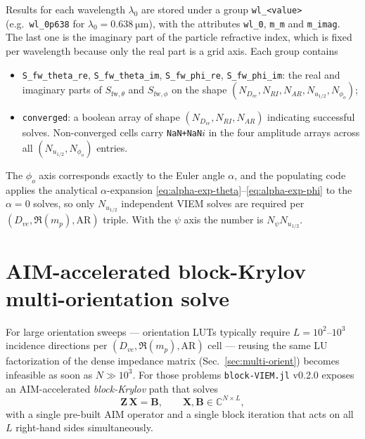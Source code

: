 \documentclass[11pt,a4paper]{article}
\begin{document}
Results for each wavelength $\lambda_0$ are stored under a group
\texttt{wl\_<value>} (e.g.\ \texttt{wl\_0p638} for
$\lambda_0 = \SI{0.638}{\micro\metre}$), with the attributes
\texttt{wl\_0}, \texttt{m\_m} and \texttt{m\_imag}. The last one is
the imaginary part of the particle refractive index, which is fixed per
wavelength because only the real part is a grid axis. Each group
contains
\begin{itemize}
  \item \texttt{S\_fw\_theta\_re}, \texttt{S\_fw\_theta\_im},
        \texttt{S\_fw\_phi\_re}, \texttt{S\_fw\_phi\_im}: the real and
        imaginary parts of $S_{\text{fw},\theta}$ and
        $S_{\text{fw},\phi}$ on the shape
        $(N_{D_{ve}}, N_{RI}, N_{AR}, N_{u_{1/2}}, N_{\phi_o})$;
  \item \texttt{converged}: a boolean array of shape
        $(N_{D_{ve}}, N_{RI}, N_{AR})$ indicating successful solves.
        Non-converged cells carry \texttt{NaN+NaN$i$} in the four
        amplitude arrays across all $(N_{u_{1/2}},N_{\phi_o})$ entries.
\end{itemize}
The $\phi_o$ axis corresponds exactly to the Euler angle $\alpha$, and
the populating code applies the analytical $\alpha$-expansion
\eqref{eq:alpha-exp-theta}--\eqref{eq:alpha-exp-phi} to the $\alpha = 0$
solves, so only $N_{u_{1/2}}$ independent VIEM solves are required per
$(D_{ve},\Re(m_p),\text{AR})$ triple. With the $\psi$ axis the number
is $N_\psi N_{u_{1/2}}$.

\section{AIM-accelerated block-Krylov multi-orientation solve}
\label{sec:block-krylov}

For large orientation sweeps --- orientation LUTs typically require
$L = 10^2$--$10^3$ incidence directions per $(D_{ve},\Re(m_p),
\text{AR})$ cell --- reusing the same LU factorization of the dense
impedance matrix (Sec.~\ref{sec:multi-orient}) becomes infeasible as
soon as $N \gg 10^3$. For those problems \texttt{block-VIEM.jl} v0.2.0
exposes an AIM-accelerated \emph{block-Krylov} path that solves
\begin{equation}
  \label{eq:block-system}
  \mathbf{Z}\,\mathbf{X} = \mathbf{B},
  \qquad
  \mathbf{X},\mathbf{B}\in\mathbb{C}^{N\times L},
\end{equation}
with a single pre-built AIM operator and a single block iteration that
acts on all $L$ right-hand sides simultaneously.
\end{document}
